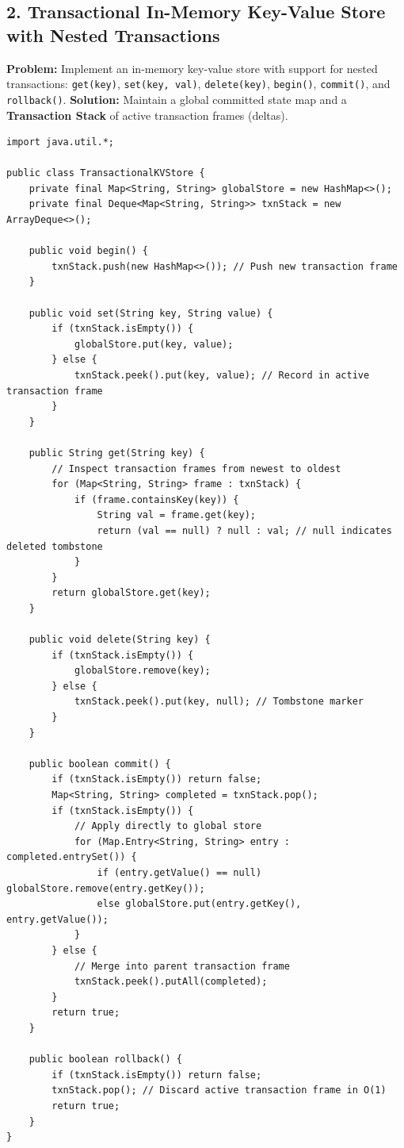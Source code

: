 \documentclass[10pt,journal,compsoc,onecolumn]{IEEEtran}
\begin{document}
\subsection{2. Transactional In-Memory Key-Value Store with Nested Transactions}
\textbf{Problem:} Implement an in-memory key-value store with support for nested transactions: \texttt{get(key)}, \texttt{set(key, val)}, \texttt{delete(key)}, \texttt{begin()}, \texttt{commit()}, and \texttt{rollback()}.
\textbf{Solution:} Maintain a global committed state map and a \textbf{Transaction Stack} of active transaction frames (deltas).

\begin{verbatim}
import java.util.*;

public class TransactionalKVStore {
    private final Map<String, String> globalStore = new HashMap<>();
    private final Deque<Map<String, String>> txnStack = new ArrayDeque<>();

    public void begin() {
        txnStack.push(new HashMap<>()); // Push new transaction frame
    }

    public void set(String key, String value) {
        if (txnStack.isEmpty()) {
            globalStore.put(key, value);
        } else {
            txnStack.peek().put(key, value); // Record in active transaction frame
        }
    }

    public String get(String key) {
        // Inspect transaction frames from newest to oldest
        for (Map<String, String> frame : txnStack) {
            if (frame.containsKey(key)) {
                String val = frame.get(key);
                return (val == null) ? null : val; // null indicates deleted tombstone
            }
        }
        return globalStore.get(key);
    }

    public void delete(String key) {
        if (txnStack.isEmpty()) {
            globalStore.remove(key);
        } else {
            txnStack.peek().put(key, null); // Tombstone marker
        }
    }

    public boolean commit() {
        if (txnStack.isEmpty()) return false;
        Map<String, String> completed = txnStack.pop();
        if (txnStack.isEmpty()) {
            // Apply directly to global store
            for (Map.Entry<String, String> entry : completed.entrySet()) {
                if (entry.getValue() == null) globalStore.remove(entry.getKey());
                else globalStore.put(entry.getKey(), entry.getValue());
            }
        } else {
            // Merge into parent transaction frame
            txnStack.peek().putAll(completed);
        }
        return true;
    }

    public boolean rollback() {
        if (txnStack.isEmpty()) return false;
        txnStack.pop(); // Discard active transaction frame in O(1)
        return true;
    }
}
\end{verbatim}
\end{document}
